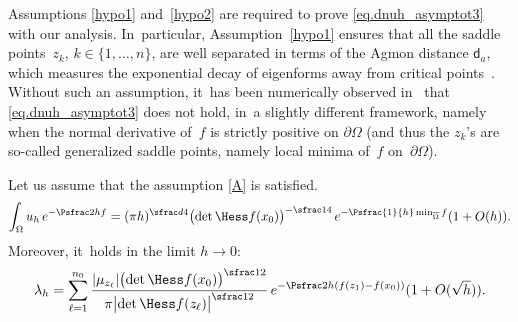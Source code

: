 Assumptions \eqref{hypo1} and~\eqref{hypo2} are required to prove
\eqref{eq.dnuh_asymptot3} with our analysis. In~particular, Assumption~\eqref{hypo1}
ensures that all the saddle points~$z_k$, $k\in\{1,\dots,n\}$, are
well separated in terms of the Agmon distance $\mathsf d_a$, which
measures the exponential decay of eigenforms away from critical
points~\cite{HKN}. Without such an assumption, it~has been numerically
observed in~\cite[\S1.6.2]{DLLN} that
\eqref{eq.dnuh_asymptot3} does not hold, in~a slightly different
framework, namely when the normal derivative of~$f$ is strictly
positive on $\partial \Omega$ (and thus the $z_k$'s are so-called
generalized saddle points, namely local minima
of~$f$ on~$\partial \Omega$).

\begin{proposition}\label{pr.LP-N}
Let us assume that the assumption \ref{A} is satisfied.
\begin{equation}\label{eq.moyenn-uh}
\int_\Omega u_h\, e^{-\Psfrac 2h f}= (\pi h)^{\sfrac d4} \bigl(\det \Hess f(x_0)\bigr)^{-\sfrac 14} \, e^{-\Psfrac{1}{h}\min_{\overline{\Omega}} f} (1+O(h)).
\end{equation}
Moreover, it~holds in the limit $h\to 0$:
\begin{equation}\label{eq.lambda_h-Equiv}
\lambda_h= \sum\limits _{ \ell=1 }^{n_0} \frac{ \vert \mu_{z_\ell}\vert \bigl(\det \Hess f (x_0) \bigr)^{\sfrac12} }{ \pi \bigl\vert \det \Hess f (z_\ell) \bigr\vert^{\sfrac12} }\, e^{-\Psfrac 2h (f(z_1)-f(x_0))} (1+O(\sqrt h)).
\end{equation}
\end{proposition}

